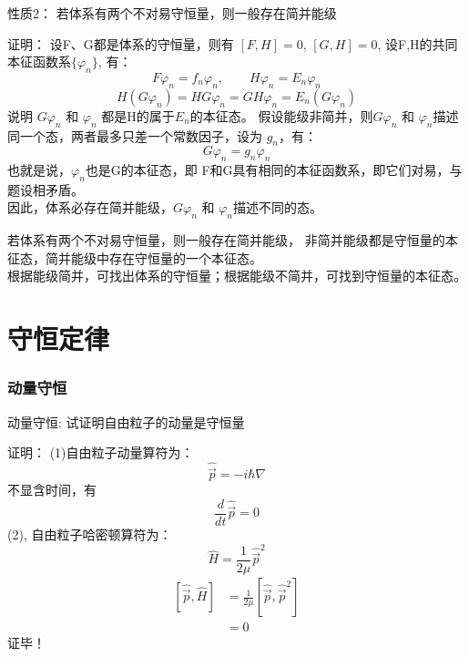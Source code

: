 \begin{frame} [allowframebreaks=]
    \frametitle{} 
    \begin{tcolorbox1}{性质2：}
        若体系有两个不对易守恒量，则一般存在简并能级
    \end{tcolorbox1}
    \alert{证明：} 设F、G都是体系的守恒量，则有 $[F,H]=0$, $[G,H]=0$, 设F,H的共同本征函数系$\{\varphi_n\}$, 有：\\ 
    $$F\varphi_n =f_n \varphi_n, \qquad H\varphi_n =E_n \varphi_n $$
    $$H(G\varphi_n) =HG\varphi_n=GH\varphi_n= E_n (G\varphi_n)$$
    说明 $G\varphi_n$ 和 $\varphi_n$ 都是H的属于$E_n$的本征态。
    假设能级非简并，则$G\varphi_n$ 和 $\varphi_n$描述同一个态，两者最多只差一个常数因子，设为 $g_n$，有：
    $$G\varphi_n=g_n \varphi_n$$
    也就是说，$\varphi_n$也是G的本征态，即 F和G具有相同的本征函数系，即它们对易，与题设相矛盾。\\
    因此，体系必存在简并能级，$G\varphi_n$ 和 $\varphi_n$描述不同的态。
    \begin{tcolorbox}[colback=yellow!5,colframe=yellow!75!black,title=推论：]
        若体系有两个不对易守恒量，则一般存在简并能级， 非简并能级都是守恒量的本征态，简并能级中存在守恒量的一个本征态。\\
        根据能级简并，可找出体系的守恒量；根据能级不简并，可找到守恒量的本征态。
    \end{tcolorbox}
\end{frame}

\section{守恒定律}

\begin{frame} [allowframebreaks=]
    \frametitle{动量守恒} 
    \begin{tcolorbox1}{动量守恒:}
        试证明自由粒子的动量是守恒量                                   
    \end{tcolorbox1}
    \alert{证明：} (1)自由粒子动量算符为：
    $$ \hat{\vec{p}} = -i\hbar\nabla  $$
    不显含时间，有 $$\frac{d}{dt}\hat{\vec{p}}=0$$ 
    (2), 自由粒子哈密顿算符为： $$ \hat{H} = \frac{1}{2\mu} \hat{\vec{p}}^2 $$
    $$\begin{aligned}
        [\hat{\vec{p}},\hat{H}]&= \frac{1}{2\mu}[\hat{\vec{p}}, \hat{\vec{p}}^2 ] \\
        &= 0
    \end{aligned}$$
    证毕！
\end{frame}

